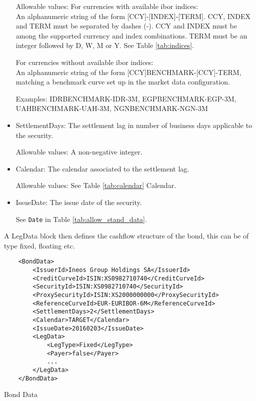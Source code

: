 \begin{itemize}
Allowable values: 
For currencies with available ibor indices: \\
An alphanumeric string of the form [CCY]-[INDEX]-[TERM]. CCY, INDEX and TERM must be separated by dashes (-). CCY and INDEX must be among the supported currency and index combinations. TERM must be an integer followed by D, W, M or Y. See Table \ref{tab:indices}. 

For currencies without available ibor indices:  \\
An alphanumeric string of the form [CCY]BENCHMARK-[CCY]-TERM, matching a benchmark curve set up in the market data configuration.

Examples: IDRBENCHMARK-IDR-3M, EGPBENCHMARK-EGP-3M, UAHBENCHMARK-UAH-3M, NGNBENCHMARK-NGN-3M
 
\item SettlementDays: The settlement lag in number of business days applicable to the security.

Allowable values: A non-negative integer.

\item Calendar: The calendar associated to the settlement lag.

Allowable values: See Table \ref{tab:calendar} Calendar.

\item IssueDate: The issue date of the security.

See \lstinline!Date! in Table \ref{tab:allow_stand_data}.

\end{itemize}

A LegData block then defines the cashflow structure of the bond, this can be of type fixed, floating etc.

\begin{listing}[H]
\begin{verbatim}
    <BondData>
        <IssuerId>Ineos Group Holdings SA</IssuerId>
        <CreditCurveId>ISIN:XS0982710740</CreditCurveId>
        <SecurityId>ISIN:XS0982710740</SecurityId>
        <ProxySecurityId>ISIN:XS2000000000</ProxySecurityId>
        <ReferenceCurveId>EUR-EURIBOR-6M</ReferenceCurveId>
        <SettlementDays>2</SettlementDays>
        <Calendar>TARGET</Calendar>
        <IssueDate>20160203</IssueDate>
        <LegData>
            <LegType>Fixed</LegType>
            <Payer>false</Payer>
            ...
        </LegData>
    </BondData>
\end{verbatim}
\caption{Bond Data}
\label{lst:bonddata}
\end{listing}


